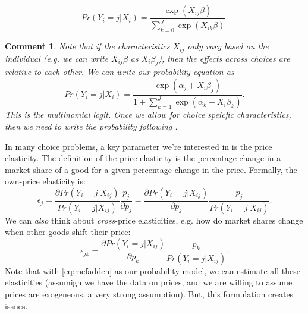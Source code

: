 \documentclass{tufte-handout}
\theoremstyle{break}
\newtheorem{cmt}{Comment}
\begin{document}
\begin{equation}
  \label{eq:mcfadden}
  Pr(Y_{i} = j | X_{i}) = \frac{\exp(X_{ij}\beta)}{\sum_{k=0}^{J}\exp(X_{ik}\beta)}.
\end{equation}

\begin{boxF}
  \begin{cmt}
  Note that if the characteristics $X_{ij}$ only vary based on the individual (e.g. we can write $X_{ij}\beta$ as $X_{i}\beta_{j}$), then the effects across choices are \emph{relative} to each other. We can write our probability equation as
\begin{equation}
  Pr(Y_{i} = j | X_{i}) = \frac{\exp(\alpha_{j} + X_{i}\beta_{j})}{1 + \sum_{k=1}^{J}\exp(\alpha_{k} + X_{i}\beta_{k})}.
\end{equation}
This is the \emph{multinomial logit}. Once we allow for choice speicfic characteristics, then we need to write the probability following .
  \end{cmt}
\end{boxF}

In many choice problems, a key parameter we're interested in is the price elasticity. The definition of the price elasticity is the percentage change in a market share of a good for a given percentage change in the price. Formally, the own-price elasticity is:
\begin{equation}
  \epsilon_{j} = \frac{\partial Pr(Y_{i} = j | X_{ij})}{Pr(Y_{i} = j | X_{ij})}\frac{p_{j}}{\partial p_{j}} = \frac{\partial Pr(Y_{i} = j | X_{ij})}{\partial p_{j}}\frac{p_{j}}{Pr(Y_{i} = j | X_{ij})}.
\end{equation}
We can \emph{also} think about \emph{cross}-price elasticities, e.g. how do market shares change when other goods shift their price: 
\begin{equation}
  \epsilon_{jk} = \frac{\partial Pr(Y_{i} = j | X_{ij})}{\partial p_{k}}\frac{p_{k}}{Pr(Y_{i} = j | X_{ij})}.
\end{equation}
Note that with \cref{eq:mcfadden} as our probability model, we can estimate all these elasticities (assumign we have the data on prices, and we are willing to assume prices are exogeneous, a very strong assumption). But, this formulation creates issues.
      
\end{document}
